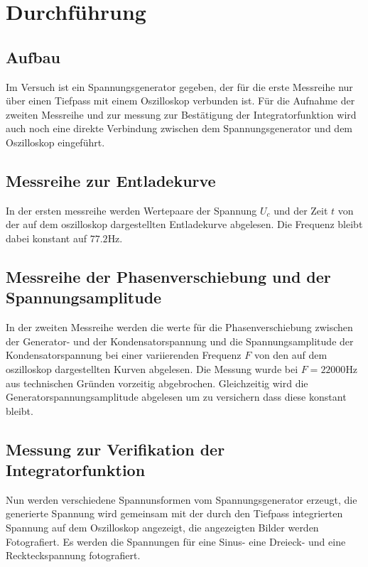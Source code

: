 \section{Durchführung}
\label{sec:Durchführung}
\subsection{Aufbau}
Im Versuch ist ein Spannungsgenerator gegeben, der für die erste Messreihe nur über einen Tiefpass mit einem Oszilloskop verbunden ist. 
Für die Aufnahme der zweiten Messreihe und zur messung zur Bestätigung der Integratorfunktion wird auch noch eine direkte Verbindung zwischen dem Spannungsgenerator und dem Oszilloskop eingeführt.
\subsection{Messreihe zur Entladekurve}
In der ersten messreihe werden Wertepaare der Spannung $U_c$ und der Zeit $t$ von der auf dem oszilloskop dargestellten Entladekurve abgelesen. 
Die Frequenz bleibt dabei konstant auf $77.2\unit{\hertz}$.
\subsection{Messreihe der Phasenverschiebung und der Spannungsamplitude}
In der zweiten Messreihe werden die werte für die Phasenverschiebung zwischen der Generator- und der Kondensatorspannung und die Spannungsamplitude der Kondensatorspannung bei einer variierenden Frequenz $F$ 
von den auf dem oszilloskop dargestellten Kurven abgelesen. Die Messung wurde bei $F = 22000\unit{\hertz}$ aus technischen Gründen vorzeitig abgebrochen.
Gleichzeitig wird die Generatorspannungsamplitude abgelesen um zu versichern dass diese konstant bleibt.
\subsection{Messung zur Verifikation der Integratorfunktion}
Nun werden verschiedene Spannunsformen vom Spannungsgenerator erzeugt, die generierte Spannung wird gemeinsam mit der durch den Tiefpass integrierten Spannung auf dem Oszilloskop angezeigt,
die angezeigten Bilder werden Fotografiert. Es werden die Spannungen für eine Sinus- eine Dreieck- und eine Reckteckspannung fotografiert.


